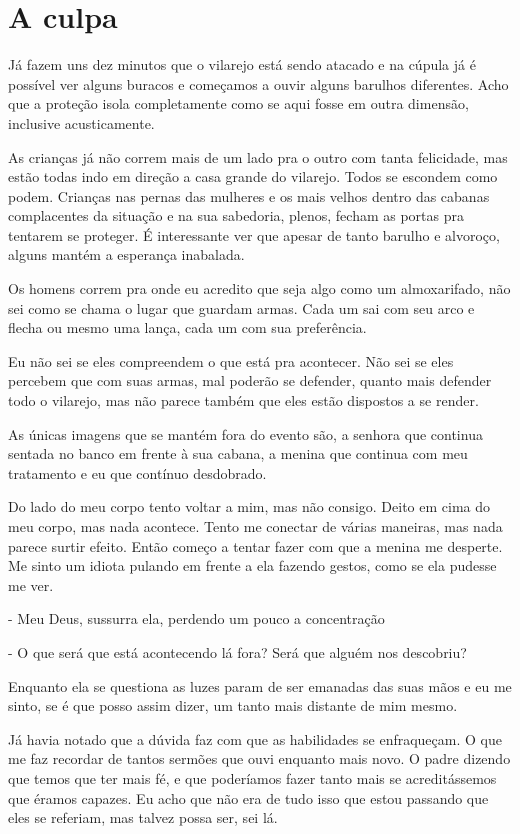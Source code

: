 \chapter{A culpa}
Já fazem uns dez minutos que o vilarejo está sendo atacado e na cúpula já é possível ver alguns buracos e começamos a ouvir alguns barulhos diferentes. Acho que a proteção isola completamente como se aqui fosse em outra dimensão, inclusive acusticamente.

As crianças já não correm mais de um lado pra o outro com tanta felicidade, mas estão todas indo em direção a casa grande do vilarejo. Todos se escondem como podem. Crianças nas pernas das mulheres e os mais velhos dentro das cabanas complacentes da situação e na sua sabedoria, plenos, fecham as portas pra tentarem se proteger. É interessante ver que apesar de tanto barulho e alvoroço, alguns mantém a esperança inabalada.

Os homens correm pra onde eu acredito que seja algo como um almoxarifado, não sei como se chama o lugar que guardam armas. Cada um sai com seu arco e flecha ou mesmo uma lança, cada um com sua preferência.

Eu não sei se eles compreendem o que está pra acontecer. Não sei se eles percebem que com suas armas, mal poderão se defender, quanto mais defender todo o vilarejo, mas não parece também que eles estão dispostos a se render.

As únicas imagens que se mantém fora do evento são, a senhora que continua sentada no banco em frente à sua cabana, a menina que continua com meu tratamento e eu que contínuo desdobrado.

Do lado do meu corpo tento voltar a mim, mas não consigo. Deito em cima do meu corpo, mas nada acontece. Tento me conectar de várias maneiras, mas nada parece surtir efeito. Então começo a tentar fazer com que a menina me desperte. Me sinto um idiota pulando em frente a ela fazendo gestos, como se ela pudesse me ver.

- Meu Deus, sussurra ela, perdendo um pouco a concentração

- O que será que está acontecendo lá fora? Será que alguém nos descobriu?

Enquanto ela se questiona as luzes param de ser emanadas das suas mãos e eu me sinto, se é que posso assim dizer, um tanto mais distante de mim mesmo.

Já havia notado que a dúvida faz com que as habilidades se enfraqueçam. O que me faz recordar de tantos sermões que ouvi enquanto mais novo. O padre dizendo que temos que ter mais fé, e que poderíamos fazer tanto mais se acreditássemos que éramos capazes. Eu acho que não era de tudo isso que estou passando que eles se referiam, mas talvez possa ser, sei lá.

